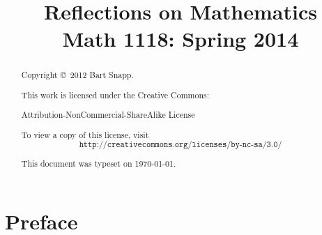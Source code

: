 

\title{
\textbf{\textsf{
\Huge Reflections on Mathematics \\
\Large Math 1118: Spring 2014
}}}
\author{}
\date{}
\maketitle



\begin{abstract}
Copyright \copyright~2012 Bart Snapp.

\vspace{.5cm}

\noindent
This work is licensed under the Creative Commons:
\begin{center}
Attribution-NonCommercial-ShareAlike License 
\end{center}
To view a copy of this license, visit
\[
\texttt{http://creativecommons.org/licenses/by-nc-sa/3.0/}
\]

\vspace{.5cm}

\noindent This document was typeset on \today.

\end{abstract}



\chapter*{Preface}


